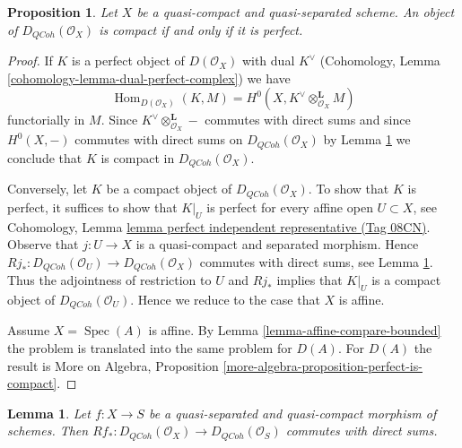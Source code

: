 \documentclass{amsart}
\theoremstyle{plain}
\newtheorem{proposition}[subsection]{Proposition}
\newtheorem{lemma}[subsection]{Lemma}
\theoremstyle{definition}
\theoremstyle{remark}
\numberwithin{equation}{subsection}
\def\Spec{\mathop{\mathrm{Spec}}}
\def\Hom{\mathop{\mathrm{Hom}}\nolimits}
\def\QCoh{\mathit{QCoh}}
\begin{document}
\begin{proposition}
\label{proposition-compact-is-perfect}
Let $X$ be a quasi-compact and quasi-separated scheme.
An object of $D_\QCoh(\mathcal{O}_X)$ is compact
if and only if it is perfect.
\end{proposition}

\begin{proof}
If $K$ is a perfect object of $D(\mathcal{O}_X)$ with dual
$K^\vee$ (Cohomology, Lemma \ref{cohomology-lemma-dual-perfect-complex})
we have
$$
\Hom_{D(\mathcal{O}_X)}(K, M) =
H^0(X, K^\vee \otimes_{\mathcal{O}_X}^\mathbf{L} M)
$$
functorially in $M$. Since $K^\vee \otimes_{\mathcal{O}_X}^\mathbf{L} -$
commutes with direct sums and since $H^0(X, -)$ commutes with direct
sums on $D_\QCoh(\mathcal{O}_X)$ by
Lemma \ref{lemma-quasi-coherence-pushforward-direct-sums}
we conclude that $K$ is compact in $D_\QCoh(\mathcal{O}_X)$.

\medskip\noindent
Conversely, let $K$ be a compact object of $D_\QCoh(\mathcal{O}_X)$.
To show that $K$ is perfect, it suffices to show that
$K|_U$ is perfect for every affine open $U \subset X$, see
Cohomology, Lemma \href{https://stacks.math.columbia.edu/tag/08CN}{lemma perfect independent representative (Tag 08CN)}.
Observe that $j : U \to X$ is a quasi-compact and separated morphism.
Hence
$Rj_* : D_\QCoh(\mathcal{O}_U) \to D_\QCoh(\mathcal{O}_X)$
commutes with direct sums, see
Lemma \ref{lemma-quasi-coherence-pushforward-direct-sums}.
Thus the adjointness of restriction to $U$ and $Rj_*$ implies that
$K|_U$ is a compact object of $D_\QCoh(\mathcal{O}_U)$.
Hence we reduce to the case that $X$ is affine.

\medskip\noindent
Assume $X = \Spec(A)$ is affine. By Lemma \ref{lemma-affine-compare-bounded}
the problem is translated into the same problem for $D(A)$.
For $D(A)$ the result is
More on Algebra, Proposition \ref{more-algebra-proposition-perfect-is-compact}.
\end{proof}


\begin{lemma}
\label{lemma-quasi-coherence-pushforward-direct-sums}
Let $f : X \to S$ be a quasi-separated and quasi-compact morphism of
schemes. Then
$Rf_* : D_\QCoh(\mathcal{O}_X) \to D_\QCoh(\mathcal{O}_S)$
commutes with direct sums.
\end{lemma}
\end{document}
